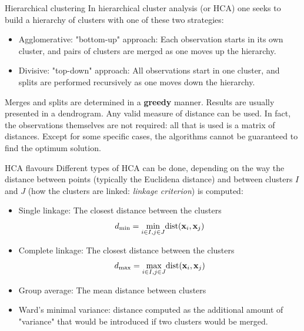 \documentclass{beamer}
\begin{document}
\begin{frame}{Hierarchical clustering}
    In hierarchical cluster analysis (or HCA) one seeks to build a hierarchy of clusters with one of these two strategies:
    \begin{itemize}
        \item Agglomerative: "bottom-up" approach: Each observation starts in its own cluster, and pairs of clusters are merged as one moves up the hierarchy.
        \item Divisive: "top-down" approach: All observations start in one cluster, and splits are performed recursively as one moves down the hierarchy.
    \end{itemize}

Merges and splits are determined in a {\bf greedy} manner. Results are usually presented in a dendrogram. Any valid measure of distance can be used. In fact, the observations themselves are not required: all that is used is a matrix of distances. Except for some specific cases, the algorithms cannot be guaranteed to find the optimum solution. 
\end{frame}

\begin{frame}{HCA flavours}
    Different types of HCA can be done, depending on the way the distance between points (typically the Euclidena distance) and between clusters $I$ and $J$ (how the clusters are linked: {\em linkage criterion}) is computed:
    \begin{itemize}
        \item Single linkage: The closest distance between the clusters
        \[
            d_{\mathrm{min}} = \underset{i \in I, j \in J}{\mathrm{min}}
            \mathrm{dist} 
            (\textbf{x}_i,\textbf{x}_j) 
        \]
        \item Complete linkage: The closest distance between the clusters
        \[
            d_{\mathrm{max}} = \underset{i \in I, j \in J}{\mathrm{max}}
            \mathrm{dist} 
            (\textbf{x}_i,\textbf{x}_j) 
        \]
        \item Group average: The mean distance between clusters
        \item Ward's minimal variance: distance computed as the additional amount of "variance" that would be introduced if two clusters would be merged.
    \end{itemize}
\end{frame}
\end{document}
